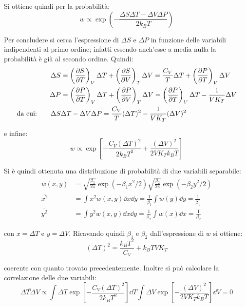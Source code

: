 \noindent Si ottiene quindi per la probabilità:
\begin{equation*}
	w \propto \exp \left(- \frac{\Delta S \Delta T - \Delta V \Delta P}{2 k_B T}\right)
\end{equation*}

Per concludere si cerca l'espressione di $\Delta S$ e $\Delta P$ in funzione delle variabili indipendenti al primo ordine; infatti essendo anch'esse a media nulla la probabilità è già al secondo ordine. Quindi:
\begin{align*}
\Delta S &= \left(\frac{\partial {S}}{\partial {T}}\right)_{V} \Delta T + \left(\frac{\partial {S}}{\partial {V}}\right)_{T} \Delta V = \frac{C_V}{T} \Delta T  + \left(\frac{\partial {P}}{\partial {T}}\right)_{V} \Delta V \\
\Delta P &= \left(\frac{\partial {P}}{\partial {T}}\right)_{V} \Delta T + \left(\frac{\partial {P}}{\partial {V}}\right)_{T} \Delta V =   \left(\frac{\partial {P}}{\partial {T}}\right)_{V}\Delta T - \frac{1}{V K_T}  \Delta V\\
\text{da cui:} \qquad  \Delta S &\Delta T - \Delta V \Delta P = \frac{C_V}{T} (\Delta T)^2 - \frac{1}{V K_T}  (\Delta V)^2
\end{align*}

\noindent e infine:
\begin{equation*}
w \propto \exp \left[- \frac{C_V (\Delta T)^2}{2 k_B T^2} + \frac{(\Delta V)^2}{2 V K_T k_B T}  \right]
\end{equation*}

Si è quindi ottenuta una distribuzione di probabilità di due variabili separabile:
\begin{align*}
w(x,y) &= \sqrt{\frac{\beta_1}{2\pi}}  \exp (-\beta_1 x^2 /2) \sqrt{\frac{\beta_2}{2\pi}}  \exp (-\beta_2 y^2 /2)\\
\overline{x^2} &= \int x^2 w(x,y) \dd x \dd y = \frac{1}{\beta_1} \int w(y) \dd y = \frac{1}{\beta_1}\\
\overline{y^2} &= \int y^2 w(x,y) \dd x \dd y = \frac{1}{\beta_2} \int w(x) \dd x = \frac{1}{\beta_2}
\end{align*}

\noindent con $x = \Delta T$ e $y = \Delta V$. Ricavando quindi $\beta_1$ e $\beta_2$ dall'espressione di $w$ si ottiene:
\begin{equation*}
\overline{(\Delta T)^2} = \frac{k_B T^2}{C_V} + k_B T V K_T
\end{equation*}

\noindent coerente con quanto trovato precedentemente. Inoltre si può calcolare la correlazione delle due variabili:
\begin{equation*}
\overline{\Delta T \Delta V} \propto \int \Delta T \exp [- \frac{C_V (\Delta T)^2}{2 k_B T^2}] \dd T \int \Delta V \exp [- \frac{(\Delta V)^2}{2 V K_T k_B T}] \dd V = 0
\end{equation*}

